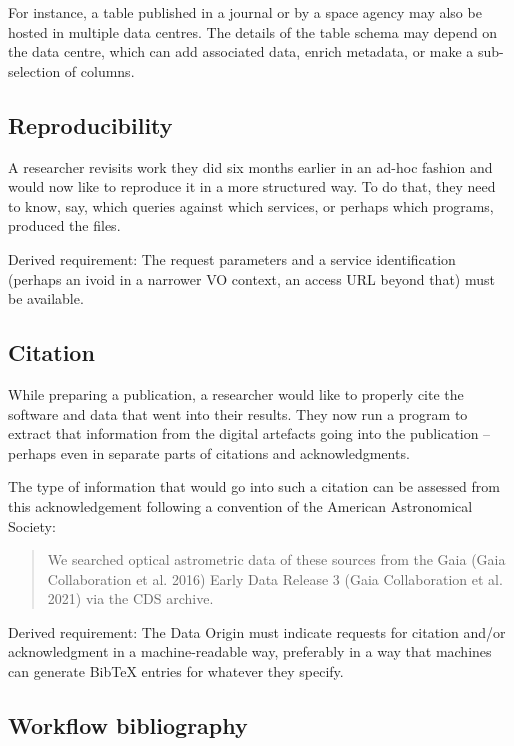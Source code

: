 \documentclass[11pt,a4paper]{ivoa}
\begin{document}
For instance, a table published in a journal or by a space agency may also be hosted in multiple data centres. The details of the table schema may depend on the data centre, which can add associated data, enrich metadata, or make a sub-selection of columns.


\subsection{Reproducibility}

A researcher revisits work they did six months earlier in an ad-hoc fashion and would now like to reproduce it in a more structured way. To do that, they need to know, say, which queries against which services, or perhaps which programs, produced the files.

Derived requirement: The request parameters and a service identification
(perhaps an ivoid in a narrower VO context, an access URL beyond that) must be available.

\subsection{Citation}
\label{sec:req-citation}

While preparing a publication, a researcher would like to properly cite the software and data that went into their results. They now run a program to extract that information from the digital artefacts going into the publication -- perhaps even in separate parts of citations and acknowledgments.

The type of information that would go into such a
citation can be assessed from this acknowledgement following a
convention of the American Astronomical Society:

\begin{quotation}
We searched optical astrometric data of these sources from the Gaia (Gaia Collaboration et al. 2016) Early Data Release 3 (Gaia Collaboration et al. 2021) via the CDS archive.
\end{quotation}

Derived requirement: The Data Origin must indicate requests for citation
and/or acknowledgment in a machine-readable way, preferably in a way
that machines can generate BibTeX entries for whatever they specify.


\subsection{Workflow bibliography}
\end{document}
